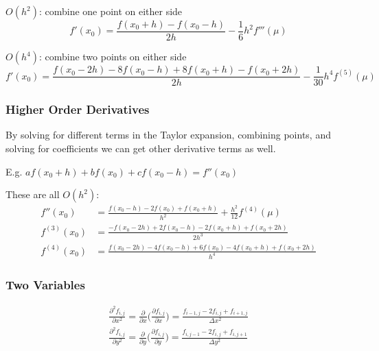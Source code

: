 \documentclass[12pt]{article}
\begin{document}
\underline{$O(h^2)$}: combine one point on either side
\[f'(x_0) = \frac{f(x_0 + h) - f(x_0 - h)}{2h} - \frac{1}{6}h^2 f'''(\mu)\]

\underline{$O(h^4)$}: combine two points on either side
\[f'(x_0) = \frac{f(x_0 - 2h) - 8f(x_0 - h) + 8f(x_0 + h) - f(x_0 + 2h)}{2h} - \frac{1}{30}h^4 f^{(5)}(\mu)\]

\subsubsection*{Higher Order Derivatives}
By solving for different terms in the Taylor expansion, combining points, and solving for coefficients we can get other derivative terms as well. 

E.g. $a f(x_0 + h) + b f(x_0) + c f(x_0 - h) = f''(x_0)$

These are all $O(h^2)$:
\begin{align*}
f''(x_0) &= \frac{f(x_0 - h) - 2f(x_0) + f(x_0 + h)}{h^2} + \frac{h^2}{12}f^{(4)}(\mu) \\
%
f^{(3)}(x_0) &= \frac{-f(x_0 - 2h) + 2f(x_0 - h) - 2f(x_0 + h) + f(x_0 + 2h)}{2h^3}\\
%
f^{(4)}(x_0) &= \frac{f(x_0 - 2h) - 4f(x_0 - h) +6f(x_0) - 4f(x_0 + h) + f(x_0 + 2h)}{h^4}
\end{align*}

\subsubsection*{Two Variables}
\begin{align*}
\frac{\partial^2 f_{i,j}}{\partial x^2} = \frac{\partial}{\partial x}\bigl(\frac{\partial f_{i,j}}{\partial x}\bigr) =
\frac{f_{i-1,j} - 2f_{i,j} + f_{i+1,j}}{\Delta x^2} \\
%
\frac{\partial^2 f_{i,j}}{\partial y^2} = \frac{\partial}{\partial y}\bigl(\frac{\partial f_{i,j}}{\partial y}\bigr) =
\frac{f_{i,j-1} - 2f_{i,j} + f_{i,j+1}}{\Delta y^2}
\end{align*}
\begin{center}
\end{center}
\end{document}
